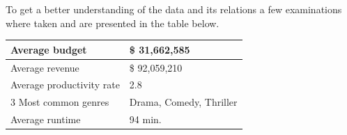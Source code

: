 To get a better understanding of the data and its relations a few examinations where taken and are presented in the table below.
\begin{center}
	\begin{tabular}{| l | l |}
	\hline
	Average budget & \$ 31,662,585 \\ \hline
	Average revenue & \$ 92,059,210 \\ \hline
	Average productivity rate & 2.8 \\ \hline
	3 Most common genres & Drama, Comedy, Thriller \\ \hline
	Average runtime & 94 min. \\ \hline
	\end{tabular}
\end{center} 